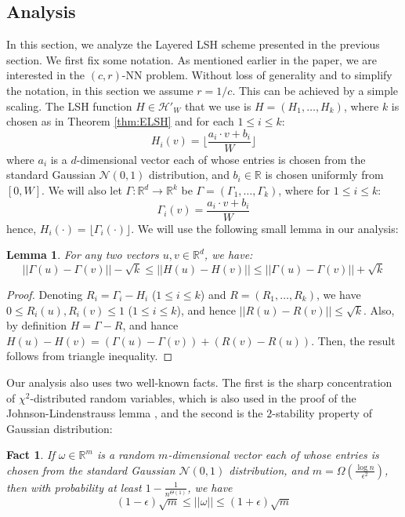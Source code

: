 \documentclass{acm_proc_article-sp}
\numberwithin{equation}{section}
\numberwithin{figure}{section}
\newtheorem{lemma}[thm]{Lemma}
\newtheorem{fact}[thm]{Fact}
\begin{document}
\subsection{Analysis}
\label{sec:analysis}

In this section, we analyze the Layered LSH scheme presented in the previous section. We first fix some notation. As mentioned earlier in the paper, we are interested in the $(c,r)$-NN problem. Without loss of generality and to simplify the notation, in this section we assume $r=1/c$. This can be achieved by a simple scaling.
The LSH function $H\in \mathcal{H'}_W$ that we use is $H=(H_1, \ldots, H_k)$, where $k$ is chosen as in Theorem \ref{thm:ELSH} and for each $1\leq i \leq k$:
\[
H_i(v) = \lfloor \frac{a_i\cdot v + b_i}{W} \rfloor
\] 
where $a_i$ is a $d$-dimensional vector each of whose entries is chosen from the standard Gaussian $\mathcal{N}(0,1)$ distribution, and $b_i \in \mathbb{R}$ is chosen uniformly from $[0,W]$. We will also let $\Gamma:\mathbb{R}^d\rightarrow \mathbb{R}^k$ be $\Gamma = (\Gamma_1, \ldots, \Gamma_k)$, where for $1\leq i \leq k$:
\[
\Gamma_i(v) = \frac{a_i\cdot v + b_i}{W} 
\]
hence, $H_i(\cdot) = \lfloor \Gamma_i(\cdot) \rfloor$. We will use the following small lemma in our analysis:
\begin{lemma} \label{lem:trieq} For any two vectors $u,v\in \mathbb{R}^d$, we have:
\[
||\Gamma(u)-\Gamma(v)|| - \sqrt{k} \leq ||H(u)-H(v)|| \leq ||\Gamma(u)-\Gamma(v)|| + \sqrt{k} 
\]
\end{lemma}
\begin{proof}
Denoting $R_i=\Gamma_i - H_i$ ($1\leq i\leq k$) and $R=(R_1, \ldots, R_k)$, we have $0\leq R_i(u), R_i(v) \leq 1$ ($1\leq i \leq k$), and hence $||R(u)-R(v)|| \leq \sqrt{k}$. Also, by definition $H=\Gamma - R$, and hance $H(u)-H(v) = (\Gamma(u)-\Gamma(v)) + (R(v)-R(u))$. Then, the result follows from triangle inequality.
\end{proof}
Our analysis also uses two well-known facts. The first is the sharp concentration of $\chi^2$-distributed random variables, which is also used in the proof of the Johnson-Lindenstrauss lemma \cite{im98, Dasgupta_JL}, and the second is the $2$-stability property of Gaussian distribution:

\begin{fact} \label{fact:sharpcon} If $\omega\in \mathbb{R}^m$ is a random $m$-dimensional vector each of whose entries is chosen from the standard Gaussian $\mathcal{N}(0,1)$ distribution, and $m=\Omega(\frac{\log n}{\epsilon^2})$, then with probability at least $1-\frac{1}{n^{\Theta(1)}}$, we have $$(1-\epsilon)\sqrt{m} \leq ||\omega|| \leq (1+\epsilon)\sqrt{m}$$
\end{fact}
\end{document}
